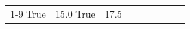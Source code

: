 \begin{table}[H]
\begin{tabular}{lllrlllll}
\cline{1-9}
True & 15.0%
\cline{1-9}
True & 17.5%

\end{tabular}
\end{table}
